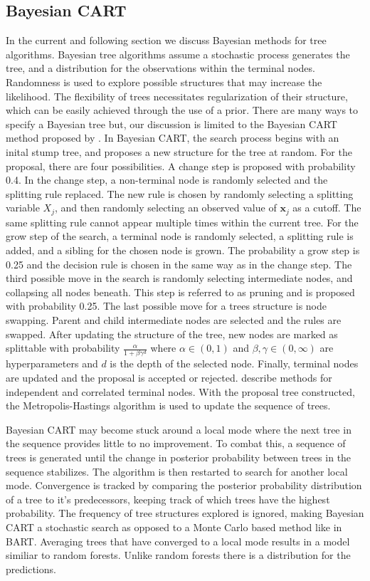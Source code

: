 \documentclass[
  12pt,
  letterpaper,
  DIV=11,
  numbers=noendperiod]{scrartcl}
\newcommand{\bm}{\mathbf}
\begin{document}
\subsection{Bayesian CART}\label{bayesian-cart}

In the current and following section we discuss Bayesian methods for
tree algorithms. Bayesian tree algorithms assume a stochastic process
generates the tree, and a distribution for the observations within the
terminal nodes. Randomness is used to explore possible structures that
may increase the likelihood. The flexibility of trees necessitates
regularization of their structure, which can be easily achieved through
the use of a prior. There are many ways to specify a Bayesian tree but,
our discussion is limited to the Bayesian CART method proposed by
\citep{bayes_cart}. In Bayesian CART, the search process begins with an
inital stump tree, and proposes a new structure for the tree at random.
For the proposal, there are four possibilities. A change step is
proposed with probability 0.4. In the change step, a non-terminal node
is randomly selected and the splitting rule replaced. The new rule is
chosen by randomly selecting a splitting variable \(X_j\), and then
randomly selecting an observed value of \(\bm x_j\) as a cutoff. The
same splitting rule cannot appear multiple times within the current
tree. For the grow step of the search, a terminal node is randomly
selected, a splitting rule is added, and a sibling for the chosen node
is grown. The probability a grow step is 0.25 and the decision rule is
chosen in the same way as in the change step. The third possible move in
the search is randomly selecting intermediate nodes, and collapsing all
nodes beneath. This step is referred to as pruning and is proposed with
probability 0.25. The last possible move for a trees structure is node
swapping. Parent and child intermediate nodes are selected and the rules
are swapped. After updating the structure of the tree, new nodes are
marked as splittable with probability \(\frac{\alpha}{1+\beta\gamma^d}\)
where \(\alpha\in(0,1)\) and \(\beta,\gamma\in(0,\infty)\) are
hyperparameters and \(d\) is the depth of the selected node. Finally,
terminal nodes are updated and the proposal is accepted or rejected.
\citep{bayes_cart} describe methods for independent and correlated
terminal nodes. With the proposal tree constructed, the
Metropolis-Hastings algorithm is used to update the sequence of trees.

Bayesian CART may become stuck around a local mode where the next tree
in the sequence provides little to no improvement. To combat this, a
sequence of trees is generated until the change in posterior probability
between trees in the sequence stabilizes. The algorithm is then
restarted to search for another local mode. Convergence is tracked by
comparing the posterior probability distribution of a tree to it's
predecessors, keeping track of which trees have the highest probability.
The frequency of tree structures explored is ignored, making Bayesian
CART a stochastic search as opposed to a Monte Carlo based method like
in BART. Averaging trees that have converged to a local mode results in
a model similiar to random forests. Unlike random forests there is a
distribution for the predictions.
\end{document}
